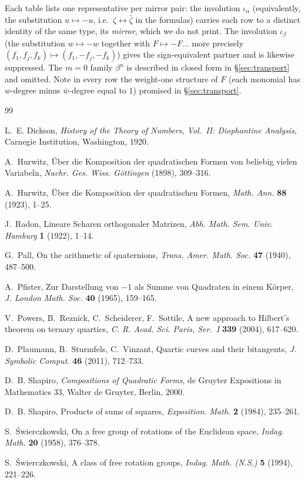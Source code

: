 \documentclass[11pt]{article}
\theoremstyle{definition}
\theoremstyle{remark}
\newcommand{\bz}{\bar{\zeta}}
\newcommand{\bw}{\bar{w}}
\newcommand{\ia}{\iota_\alpha}
\newcommand{\ib}{\iota_\beta}
\begin{document}
Each table lists one representative per mirror pair: the involution $\ia$ (equivalently, the substitution $u\mapsto-u$, i.e.\ $\zeta\leftrightarrow\bz$ in the formulas) carries each row to a distinct identity of the same type, its \emph{mirror}, which we do not print. The involution $\ib$ (the substitution $w\mapsto-w$ together with $F\mapsto-F$... more precisely $(f_1,f_j,f_k)\mapsto(f_1,-f_j,-f_k)$) gives the sign-equivalent partner and is likewise suppressed. The $m=0$ family $\beta^n$ is described in closed form in \S\ref{sec:transport} and omitted. Note in every row the weight-one structure of $F$ (each monomial has $w$-degree minus $\bw$-degree equal to $1$) promised in \S\ref{sec:transport}.



\begin{thebibliography}{99}

 L.~E. Dickson, \emph{History of the Theory of Numbers, Vol.~II: Diophantine Analysis}, Carnegie Institution, Washington, 1920.

 A.~Hurwitz, \"Uber die Komposition der quadratischen Formen von beliebig vielen Variabeln, \emph{Nachr. Ges. Wiss. G\"ottingen} (1898), 309--316.

 A.~Hurwitz, \"Uber die Komposition der quadratischen Formen, \emph{Math. Ann.} \textbf{88} (1923), 1--25.

 J.~Radon, Lineare Scharen orthogonaler Matrizen, \emph{Abh. Math. Sem. Univ. Hamburg} \textbf{1} (1922), 1--14.

 G.~Pall, On the arithmetic of quaternions, \emph{Trans. Amer. Math. Soc.} \textbf{47} (1940), 487--500.

 A.~Pfister, Zur Darstellung von $-1$ als Summe von Quadraten in einem K\"orper, \emph{J. London Math. Soc.} \textbf{40} (1965), 159--165.

 V.~Powers, B.~Reznick, C.~Scheiderer, F.~Sottile, A new approach to Hilbert's theorem on ternary quartics, \emph{C. R. Acad. Sci. Paris, Ser.~I} \textbf{339} (2004), 617--620.

 D.~Plaumann, B.~Sturmfels, C.~Vinzant, Quartic curves and their bitangents, \emph{J. Symbolic Comput.} \textbf{46} (2011), 712--733.

 D.~B. Shapiro, \emph{Compositions of Quadratic Forms}, de Gruyter Expositions in Mathematics 33, Walter de Gruyter, Berlin, 2000.

 D.~B. Shapiro, Products of sums of squares, \emph{Exposition. Math.} \textbf{2} (1984), 235--261.

 S.~\'Swierczkowski, On a free group of rotations of the Euclidean space, \emph{Indag. Math.} \textbf{20} (1958), 376--378.

 S.~\'Swierczkowski, A class of free rotation groups, \emph{Indag. Math. (N.S.)} \textbf{5} (1994), 221--226.

\end{thebibliography}
\end{document}

